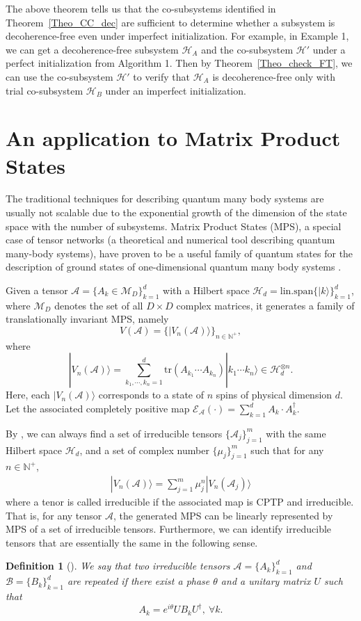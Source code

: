 \documentclass[journal]{IEEEtran}
\def\h{\ensuremath{\mathcal{H}}}
\def\a{\ensuremath{\mathcal{A}}}
\def\b{\ensuremath{\mathcal{B}}}
\def\e{\ensuremath{\mathcal{E}}}
\newtheorem{definition}{Definition}
\begin{document}
The above theorem tells us that the co-subsystems identified in Theorem~\ref{Theo_CC_dec} are sufficient to determine whether a subsystem is   decoherence-free even under imperfect initialization. For example, in Example 1, we can get a decoherence-free subsystem $\h_A$ and the co-subsystem $\h'$ under a perfect initialization from Algorithm 1. Then by Theorem~\ref{Theo_check_FT}, 
we can use the co-subsystem $\h'$ to verify that  $\h_A$ is decoherence-free only with trial co-subsystem $\h_B$ under an imperfect initialization.
 
\section{An application to Matrix Product States}
The traditional techniques for describing quantum many body systems are usually not scalable due to the exponential growth of the dimension of the state space with the number of subsystems.  Matrix Product States (MPS), a special case of tensor networks (a theoretical and numerical tool describing quantum many-body systems), have proven to be a useful family of quantum states for the description of  ground states of  one-dimensional quantum many body systems \cite{cirac2017matrix}.  

Given a  tensor $\a=\{A_{k}\in \mathcal{M}_D\}_{k=1}^{d}$ with a Hilbert space $\h_d=\textrm{lin.span}\{|k\rangle\}_{k=1}^{d}$, where $\mathcal{M}_{D}$ denotes the set of all $D\times D$ complex matrices, it generates a family of translationally invariant MPS, namely
$$V(\a)=\{|V_{n}(\a)\rangle\}_{n\in \mathbb{N^+}},$$
where $$|V_{n}(\a)\rangle=\sum_{k_1,\cdots,k_n=1}^{d}\textrm{tr}(A_{k_1}\cdots A_{k_n})|k_1\cdots k_{n}\rangle\in\h_d^{\otimes n}.$$
Here, each $|V_{n}(\a)\rangle$ corresponds to a state of $n$ spins of physical dimension $d.$
Let the associated completely positive map $\e_\a(\cdot)=\sum_{k=1}^{d}A_{k}\cdot A_{k}^\dagger$.


By \cite{cuevas2017irreducible}, we can always find a set of irreducible tensors $\{\a_{j}\}_{j=1}^{m}$ with the same Hilbert space  $\h_d$, and a set of complex number $\{\mu_{j}\}_{j=1}^{m}$ such that for any $n\in\mathbb{N^{+}}$,
\begin{eqnarray}\label{Eq_MPS}
  |V_n(\a)\rangle=\sum_{j=1}^{m}\mu_j^{n}|V_n(\a_{j})\rangle
\end{eqnarray}
where a tenor is called irreducible if the associated map is CPTP and irreducible. That is, for any tensor $\a$,  the generated MPS can be linearly represented by MPS of a set of irreducible tensors. Furthermore, we can identify irreducible tensors that are essentially the same in the following sense.
\begin{definition}[\cite{cuevas2017irreducible}]
  We say that two irreducible tensors $\a=\{A_{k}\}_{k=1}^{d}$ and $\b=\{B_{k}\}_{k=1}^{d}$ are repeated if there exist a phase $\theta$ and a unitary matrix $U$ such that 
  $$A_{k}=e^{i\theta}UB_kU^\dagger, \ \forall k.$$
\end{definition}
\end{document}

